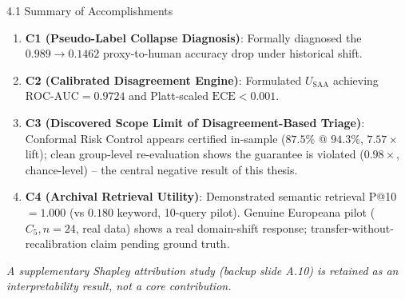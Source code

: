 \documentclass[aspectratio=169,11pt]{beamer}
\begin{document}
\begin{frame}{4.1 Summary of Accomplishments}
\footnotesize
\begin{enumerate}
    \item \textbf{C1 (Pseudo-Label Collapse Diagnosis)}: Formally diagnosed the $0.989 \rightarrow 0.1462$ proxy-to-human accuracy drop under historical shift.
    \item \textbf{C2 (Calibrated Disagreement Engine)}: Formulated $U_{\text{SAA}}$ achieving $\text{ROC-AUC} = 0.9724$ and Platt-scaled $\text{ECE} < 0.001$.
    \item \textbf{C3 (Discovered Scope Limit of Disagreement-Based Triage)}: Conformal Risk Control appears certified in-sample ($87.5\%$ @ $94.3\%$, $7.57\times$ lift); clean group-level re-evaluation shows the guarantee is violated ($0.98\times$, chance-level) -- the central negative result of this thesis.
    \item \textbf{C4 (Archival Retrieval Utility)}: Demonstrated semantic retrieval P@10$=1.000$ (vs $0.180$ keyword, 10-query pilot). Genuine Europeana pilot ($C_5, n=24$, real data) shows a real domain-shift response; transfer-without-recalibration claim pending ground truth.
\end{enumerate}
\textit{\scriptsize A supplementary Shapley attribution study (backup slide A.10) is retained as an interpretability result, not a core contribution.}
\end{frame}
\end{document}
